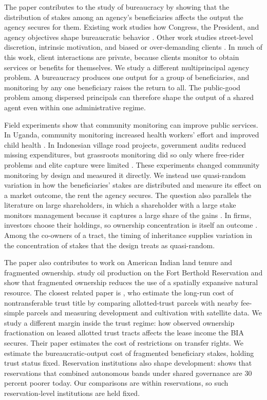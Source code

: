 \documentclass[12pt]{article}
\begin{document}
The paper contributes to the study of bureaucracy by showing that the distribution of stakes among an agency's beneficiaries affects the output the agency secures for them. Existing work studies how Congress, the President, and agency objectives shape bureaucratic behavior \citep{Fiorina1977, KiewietMcCubbins1991, Weingast1984, Moe1985, WestCooper1989, Niskanen1971, Dixit2002, GailmardPatty2012}. Other work studies street-level discretion, intrinsic motivation, and biased or over-demanding clients \citep{Lipsky2010, BesleyGhatak2005, Prendergast2003, Prendergast2007, ForandUjhelyiTing2022}. In much of this work, client interactions are private, because clients monitor to obtain services or benefits for themselves. We study a different multiprincipal agency problem. A bureaucracy produces one output for a group of beneficiaries, and monitoring by any one beneficiary raises the return to all. The public-good problem among dispersed principals can therefore shape the output of a shared agent even within one administrative regime.

Field experiments show that community monitoring can improve public services. In Uganda, community monitoring increased health workers' effort and improved child health \citep{BjorkmanSvensson2009}. In Indonesian village road projects, government audits reduced missing expenditures, but grassroots monitoring did so only where free-rider problems and elite capture were limited \citep{Olken2007}. These experiments changed community monitoring by design and measured it directly. We instead use quasi-random variation in how the beneficiaries' stakes are distributed and measure its effect on a market outcome, the rent the agency secures. The question also parallels the literature on large shareholders, in which a shareholder with a large stake monitors management because it captures a large share of the gains \citep{ShleiferVishny1986}. In firms, investors choose their holdings, so ownership concentration is itself an outcome \citep{DemsetzLehn1985}. Among the co-owners of a tract, the timing of inheritance supplies variation in the concentration of stakes that the design treats as quasi-random.

The paper also contributes to work on American Indian land tenure and fragmented ownership. \citet{LeonardParker2021} study oil production on the Fort Berthold Reservation and show that fragmented ownership reduces the use of a spatially expansive natural resource. The closest related paper is \citet{DippelFryeLeonard2025}, who estimate the long-run cost of nontransferable trust title by comparing allotted-trust parcels with nearby fee-simple parcels and measuring development and cultivation with satellite data. We study a different margin inside the trust regime: how observed ownership fractionation on leased allotted trust tracts affects the lease income the BIA secures. Their paper estimates the cost of restrictions on transfer rights. We estimate the bureaucratic-output cost of fragmented beneficiary stakes, holding trust status fixed. Reservation institutions also shape development: \citet{Dippel2014} shows that reservations that combined autonomous bands under shared governance are 30 percent poorer today. Our comparisons are within reservations, so such reservation-level institutions are held fixed.
\end{document}

